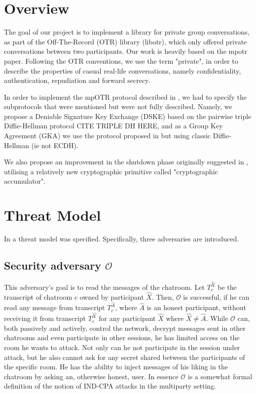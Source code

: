 \documentclass[12pt,titlepage,a4paper]{article}
\begin{document}
\tableofcontents
\newpage
{
\section{Overview}
The goal of our project is to implement a library for private group conversations, as part of the Off-The-Record (OTR) library (libotr), which only offered private conversations between two participants. Our work is heavily based on the mpotr \cite{mpotr} paper. Following the OTR conventions, we use the term "private", in order to describe the properties of casual real-life conversations, namely confidentiality, authentication, repudiation and forward secrecy.

In order to implement the mpOTR protocol described in \cite{mpotr}, we had to specify the subprotocols that were mentioned but were not fully described. Namely, we propose a Deniable Signature Key Exchange (DSKE) based on the pairwise triple Diffie-Hellman protocol CITE TRIPLE DH HERE, and as a  Group Key Agreement (GKA) we use the protocol proposed in \cite{mpenc} but using classic Diffie-Hellman (ie not ECDH).

We also propose an improvement in the shutdown phase originally suggested in \cite{mpotr},
utilising a relatively new cryptographic primitive called "cryptographic accumulator".

\section{Threat Model}
\label{threat_model}
In \cite{mpotr} a threat model was specified. Specifically, three adversaries are introduced.

\subsection{Security adversary $\mathcal{O}$}
This adversary's goal is to read the messages of the chatroom.
Let $T_c^{\hat{X}}$ be the transcript of chatroom $c$ owned by participant $\hat{X}$.
Then, $\mathcal{O}$ is successful, if he can read any message from transcript $T_c^{\hat{A}}$, where $\hat{A}$ is an honest participant, without receiving it from transcript $T_c^{\hat{X}}$ for any participant $\hat{X}$ where $\hat{X} \ne \hat{A}$.
While $\mathcal{O}$ can, both passively and actively, control the network, decrypt messages sent in other chatrooms and even participate in other sessions, he has limited access on the room he wants to attack.
Not only can he not participate in the session under attack, but he also cannot ask for any secret shared between the participants of the specific room.
He has the ability to inject messages of his liking in the chatroom by asking an, otherwise honest, user.
In essence $\mathcal{O}$ is a somewhat formal definition of the notion of IND-CPA attacks in the multiparty setting.

}
\end{document}
